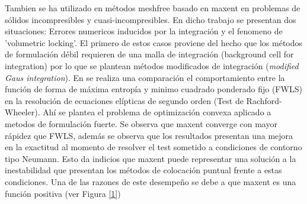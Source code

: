 Tambien se ha utilizado en métodos meshfree basado en maxent en problemas de sólidos incompresibles y cuasi-incompresibles\cite{maxent_en_elasticidad}. En dicho trabajo se presentan dos situaciones: Errores numericos inducidos por la integración y el fenomeno de 'volumetric locking'. El primero de estos casos proviene del hecho que los métodos de formulación débil requieren de una malla de integración (background cell for integration) por lo que se plantean métodos modificados de integración (\textit{modified Gaus integration}). En \cite{marchant} se realiza una comparación el comportamiento entre la función de forma de máxima entropía y minimo cuadrado ponderado fijo (FWLS) en la resolución de ecuaciones elípticas  de segundo orden (Test de Rachford-Wheeler). Ahí se plantea el problema de optimización convexa aplicado a metodos de formulación fuerte. Se observa que maxent converge con mayor rápidez que FWLS, además se observa que los resultados presentan una mejora en la exactitud al momento de resolver el test sometido a condiciones de contorno tipo Neumann. Esto da indicios que maxent puede representar una solución a la inestabilidad que presentan los métodos de colocación puntual frente a estas condiciones. Una de las razones de este desempeño se debe a que maxent es una función positiva (ver Figura \ref{1})

